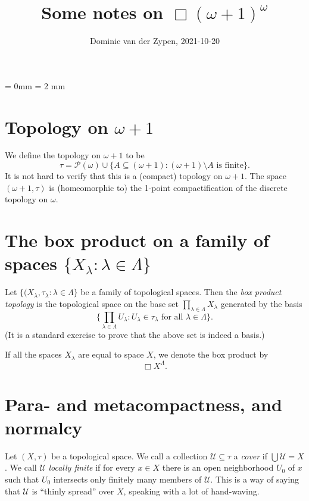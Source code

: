 \documentclass[12pt, a4paper]{amsart}
\begin{document}
\title{Some notes on $\Box(\omega+1)^\omega$}

\author{Dominic van der Zypen, 2021-10-20}



\maketitle
\parindent = 0mm
\parskip = 2 mm
\section{Topology on $\omega+1$}
We define the topology on $\omega+1$ to be $$\tau = {\mathcal P}(\omega)\cup 
\{A\subseteq (\omega+1): (\omega+1) \setminus A \text{ is finite}\}.$$
It is not hard to verify that this is a (compact) topology on $\omega+1$.
The space
$(\omega+1,\tau)$ is (homeomorphic to) the 1-point compactification of  the 
discrete topology on $\omega$.

\section{The box product on a family of spaces $\{X_\lambda:\lambda \in \Lambda\}$}
Let $\{(X_\lambda,\tau_\lambda:\lambda \in \Lambda\}$ be a family of topological spaces.
Then the {\em box product topology} is the topological space on the 
base set $\prod_{\lambda \in \Lambda}X_\lambda$ generated by the basis
$$\{\prod_{\lambda \in \Lambda}U_\lambda: U_\lambda \in \tau_\lambda \text{ 
for all } \lambda \in \Lambda\}.$$
(It is a standard exercise to prove that the above set is indeed a basis.)

If all the spaces $X_\lambda$ are equal to space $X$, we denote the 
box product by $$\Box X^\Lambda.$$

\section{Para- and metacompactness, and normalcy}
Let $(X,\tau)$ be a topological space. We call a collection ${\mathcal U}\subseteq \tau$ 
a {\em cover} if $\bigcup{\mathcal U} = X$. We call ${\mathcal U}$ {\em locally finite} 
if for every $x\in X$ there is an open neighborhood $U_0$ of $x$ such that 
$U_0$ intersects only finitely many members of $\mathcal U$. This is a way of 
saying that ${\mathcal U}$ is ``thinly spread'' over $X$, speaking with a lot 
of hand-waving. 
\end{document}
